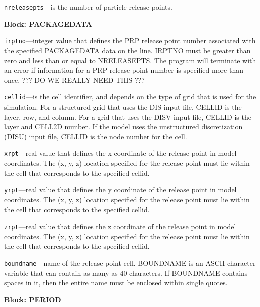 \begin{description}
\item \texttt{nreleasepts}---is the number of particle release points.

\end{description}
\item \textbf{Block: PACKAGEDATA}

\begin{description}
\item \texttt{irptno}---integer value that defines the PRP release point number associated with the specified PACKAGEDATA data on the line. IRPTNO must be greater than zero and less than or equal to NRELEASEPTS.  The program will terminate with an error if information for a PRP release point number is specified more than once. ??? DO WE REALLY NEED THIS ???

\item \texttt{cellid}---is the cell identifier, and depends on the type of grid that is used for the simulation.  For a structured grid that uses the DIS input file, CELLID is the layer, row, and column.   For a grid that uses the DISV input file, CELLID is the layer and CELL2D number.  If the model uses the unstructured discretization (DISU) input file, CELLID is the node number for the cell.

\item \texttt{xrpt}---real value that defines the x coordinate of the release point in model coordinates.  The (x, y, z) location specified for the release point must lie within the cell that corresponds to the specified cellid.

\item \texttt{yrpt}---real value that defines the y coordinate of the release point in model coordinates.  The (x, y, z) location specified for the release point must lie within the cell that corresponds to the specified cellid.

\item \texttt{zrpt}---real value that defines the z coordinate of the release point in model coordinates.  The (x, y, z) location specified for the release point must lie within the cell that corresponds to the specified cellid.

\item \texttt{boundname}---name of the release-point cell.  BOUNDNAME is an ASCII character variable that can contain as many as 40 characters.  If BOUNDNAME contains spaces in it, then the entire name must be enclosed within single quotes.

\end{description}
\item \textbf{Block: PERIOD}

